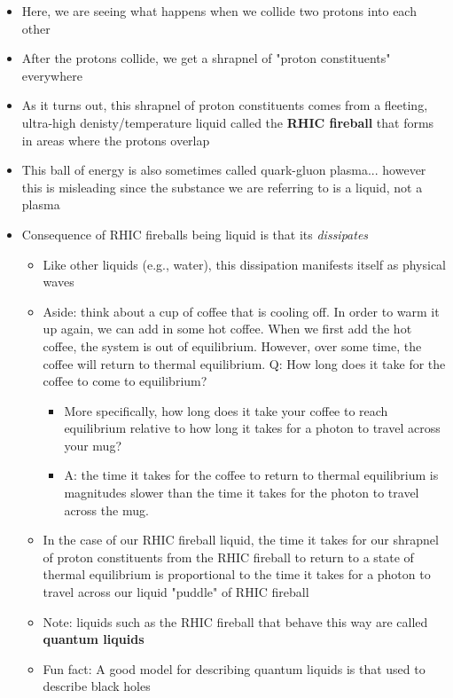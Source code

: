 \documentclass[a4paper]{article}
\begin{document}
\begin{itemize}
    \item Here, we are seeing what happens when we collide two protons into each other 
    \item After the protons collide, we get a shrapnel of "proton constituents" everywhere 
    \item As it turns out, this shrapnel of proton constituents comes from a fleeting, ultra-high denisty/temperature liquid called the \textbf{RHIC fireball} that forms in areas where the protons overlap 
    \item This ball of energy is also sometimes called quark-gluon plasma... however this is misleading since the substance we are referring to is a liquid, not a plasma 
    \item Consequence of RHIC fireballs being liquid is that its \textit{dissipates} 
    \begin{itemize}
        \item Like other liquids (e.g., water), this dissipation manifests itself as physical waves 
        \item Aside: think about a cup of coffee that is cooling off. In order to warm it up again, we can add in some hot coffee. When we first add the hot coffee, the system is out of equilibrium. However, over some time, the coffee will return to thermal equilibrium. Q: How long does it take for the coffee to come to equilibrium? 
        \begin{itemize}
            \item More specifically, how long does it take your coffee to reach equilibrium relative to how long it takes for a photon to travel across your mug?
            \item A: the time it takes for the coffee to return to thermal equilibrium is magnitudes slower than the time it takes for the photon to travel across the mug. 
        \end{itemize}
        \item In the case of our RHIC fireball liquid, the time it takes for our shrapnel of proton constituents from the RHIC fireball to return to a state of thermal equilibrium is proportional to the time it takes for a photon to travel across our liquid "puddle" of RHIC fireball
        \item Note: liquids such as the RHIC fireball that behave this way are called \textbf{quantum liquids}
    \item Fun fact: A good model for describing quantum liquids is that used to describe black holes 
    \end{itemize}
\end{itemize}
\end{document}
